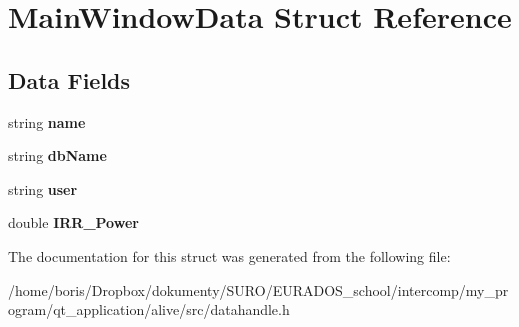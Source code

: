 \hypertarget{structMainWindowData}{\section{Main\-Window\-Data Struct Reference}
\label{structMainWindowData}
}
\subsection*{Data Fields}
\begin{DoxyCompactItemize}
\item 
\hypertarget{structMainWindowData_a13e994aac6efee77384aadf76389582c}{string {\bfseries name}}\label{structMainWindowData_a13e994aac6efee77384aadf76389582c}

\item 
\hypertarget{structMainWindowData_a3a1ed9bff4936fc9560c58c9d7cee92b}{string {\bfseries db\-Name}}\label{structMainWindowData_a3a1ed9bff4936fc9560c58c9d7cee92b}

\item 
\hypertarget{structMainWindowData_ae7731484e12a6e36e2d8e5415a0cad31}{string {\bfseries user}}\label{structMainWindowData_ae7731484e12a6e36e2d8e5415a0cad31}

\item 
\hypertarget{structMainWindowData_a84348f79f55b9c9da3b9c2d892f86a51}{double {\bfseries I\-R\-R\-\_\-\-Power}}\label{structMainWindowData_a84348f79f55b9c9da3b9c2d892f86a51}

\end{DoxyCompactItemize}


The documentation for this struct was generated from the following file\-:\begin{DoxyCompactItemize}
\item 
/home/boris/\-Dropbox/dokumenty/\-S\-U\-R\-O/\-E\-U\-R\-A\-D\-O\-S\-\_\-school/intercomp/my\-\_\-program/qt\-\_\-application/alive/src/datahandle.\-h\end{DoxyCompactItemize}
